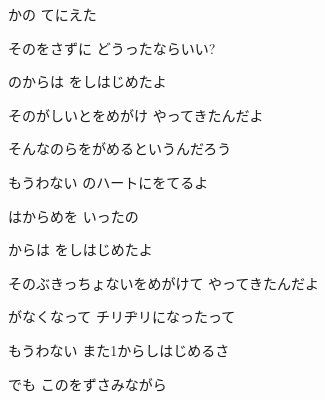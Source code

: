 \documentclass[14pt]{ltjsarticle}
\begin{document}
{  かの てにえた
  \jisho{}

  そのをさずに どうったならいい?
  \jisho{}

\item
  のからは をしはじめたよ
  \jisho{}

  そのがしいとをめがけ やってきたんだよ
  \jisho{}

\item
  そんなのらをがめるというんだろう
  \jisho{}

  もうわない のハートにをてるよ
  \jisho{}

  はからめを いったの
  \jisho{}

\item
  からは をしはじめたよ
  \jisho{}

  そのぶきっちょないをめがけて やってきたんだよ
  \jisho{}

\item
  がなくなって チリヂリになったって
  \jisho{}

  もうわない また1からしはじめるさ
  \jisho{}

  でも このをずさみながら
  \jisho{}

}
\end{document}

